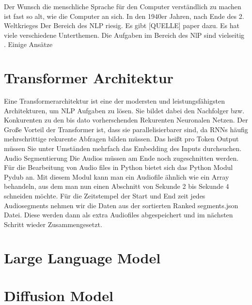 Der Wunsch die menschliche Sprache für den Computer verständlich zu machen ist fast so alt, wie die Computer an sich. 
In den 1940er Jahren, nach Ende des 2. Weltkrieges 
Der Bereich des NLP riesig. 
Es gibt [QUELLE] paper dazu. 
Es hat viele verschiedene Unterthemen. 
Die Aufgaben im Bereich des NlP sind vielseitig . Einige Ansätze 

\section{Transformer Architektur}


Eine Transformerarchitektur ist eine der modersten und leistungsfähigsten Architekturen, um NLP Aufgaben zu lösen. Sie bildet dabei den Nachfolger bzw. Konkurenten zu den bis dato vorherschenden Rekurenten Neuronalen Netzen. Der Große Vorteil der Transformer ist, dass sie parallelisierbarer sind, da RNNs häufig mehrschrittige rekurente Abfragen bilden müssen. Das heißt pro Token Output müssen Sie unter Umständen mehrfach das Embedding des Inputs durchsuchen. Audio Segmentierung Die Audios müssen am Ende noch zugeschnitten werden. 
Für die Bearbeitung von Audio files in Python bietet sich das Python Modul Pydub an. Mit diesem Modul kann man ein Audiofile ähnlich wie ein Array behandeln, aus dem man nun einen Abschnitt von Sekunde 2 bis Sekunde 4 schneiden möchte. 
Für die Zeitstempel der Start und End zeit jedes Audiosegments nehmen wir die Daten aus der sortierten Ranked segments.json Datei.
Diese werden dann als extra Audiofiles abgespeichert und im nächsten Schritt wieder Zusammengesetzt.

\section{Large Language Model}

\section{Diffusion Model}